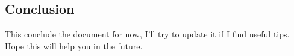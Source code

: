 \documentclass[
]{article}
\begin{document}
\newline

\hypertarget{conclusion}{%
\subsection{Conclusion}\label{conclusion}}

This conclude the document for now, I'll try to update it if I find
useful tips. Hope this will help you in the future.
\end{document}
